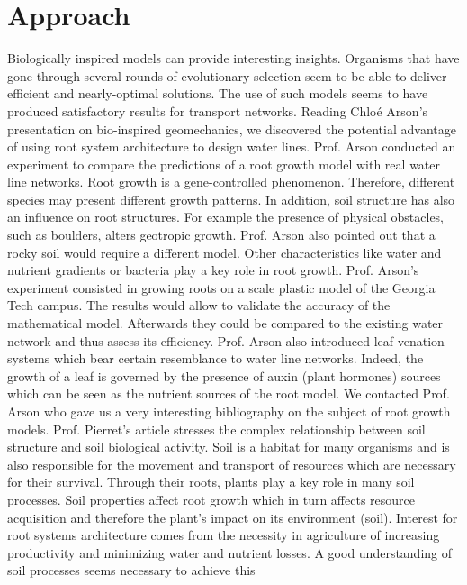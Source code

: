 ﻿\chapter{Approach}
\label{capitolo3}
\thispagestyle{empty}



\noindent Biologically inspired models can provide interesting insights. Organisms that have gone
through several rounds of evolutionary selection seem to be able to deliver efficient and
nearly-optimal solutions. The use of such models seems to have produced satisfactory
results for transport networks.
\noindent Reading Chlo\'e Arson’s presentation on bio-inspired geomechanics, we discovered the
potential advantage of using root system architecture to design water lines. Prof. Arson
conducted an experiment to compare the predictions of a root growth model with real
water line networks. Root growth is a gene-controlled phenomenon. Therefore, different
species may present different growth patterns. In addition, soil structure has also an influence
on root structures. For example the presence of physical obstacles, such as boulders,
alters geotropic growth. Prof. Arson also pointed out that a rocky soil would require a different model. Other characteristics like water and nutrient gradients or bacteria play
a key role in root growth. Prof. Arson’s experiment consisted in growing roots on a
scale plastic model of the Georgia Tech campus. The results would allow to validate the
accuracy of the mathematical model. Afterwards they could be compared to the existing
water network and thus assess its efficiency. Prof. Arson also introduced leaf venation
systems which bear certain resemblance to water line networks. Indeed, the growth of a
leaf is governed by the presence of auxin (plant hormones) sources which can be seen as
the nutrient sources of the root model.
We contacted Prof. Arson who gave us a very interesting bibliography on the subject
of root growth models. Prof. Pierret’s article stresses the complex relationship between
soil structure and soil biological activity. Soil is a habitat for many organisms and is
also responsible for the movement and transport of resources which are necessary for
their survival. Through their roots, plants play a key role in many soil processes. Soil
properties affect root growth which in turn affects resource acquisition and therefore the
plant’s impact on its environment (soil). Interest for root systems architecture comes
from the necessity in agriculture of increasing productivity and minimizing water and
nutrient losses. A good understanding of soil processes seems necessary to achieve this
